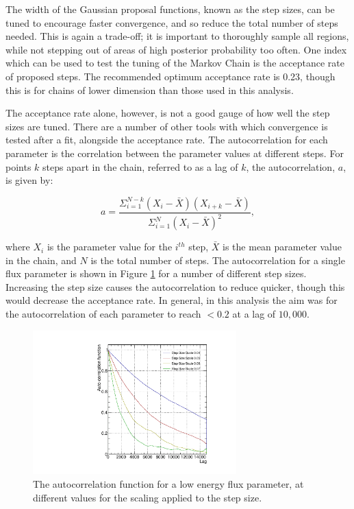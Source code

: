 The width of the Gaussian proposal functions, known as the step sizes, can be tuned to encourage faster convergence, and so reduce the total number of steps needed. This is again a trade-off; it is important to thoroughly sample all regions, while not stepping out of areas of high posterior probability too often. One index which can be used to test the tuning of the Markov Chain is the acceptance rate of proposed steps. The recommended optimum acceptance rate is 0.23\cite{accrate}, though this is for chains of lower dimension than those used in this analysis. 

The acceptance rate alone, however, is not a good gauge of how well the step sizes are tuned. There are a number of other tools with which convergence is tested after a fit, alongside the acceptance rate. The autocorrelation for each parameter is the correlation between the parameter values at different steps. For points $k$ steps apart in the chain, referred to as a lag of $k$, the autocorrelation, $a$, is given by:

\begin{equation}
a = \frac{\Sigma^{N-k}_{i=1}(X_i - \bar{X})(X_{i+k} - \bar{X})}{\Sigma^N_{i=1}(X_i-\bar{X})^2},
\end{equation}

where $X_i$ is the parameter value for the $i^{th}$ step, $\bar{X}$ is the mean parameter value in the chain, and $N$ is the total number of steps. The autocorrelation for a single flux parameter is shown in Figure \ref{fig:autocorr} for a number of different step sizes. Increasing the step size causes the autocorrelation to reduce quicker, though this would decrease the acceptance rate. In general, in this analysis the aim was for the autocorrelation of each parameter to reach $<0.2$ at a lag of $10,000$.

\begin{figure}[!htbp]
\centering
\includegraphics*[width=0.7\textwidth,clip]{figs/autoCorr}
\caption{The autocorrelation function for a low energy flux parameter, at different values for the scaling applied to the step size.}\label{fig:autocorr}
\end{figure}


